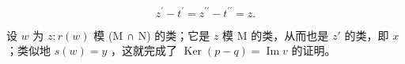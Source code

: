\[
z ^ {\prime} - t ^ {\prime} = z ^ {\prime \prime} - t ^ {\prime \prime} = z.
\]

设 \(w\) 为 \(z; r(w)\) 模 (M ∩ N) 的类；它是 \(z\) 模 M 的类，从而也是 \(z'\) 的类，即 \(x\) ；类似地 \(s(w) = y\) ，这就完成了 \(\operatorname{Ker}(p - q) = \operatorname{Im} v\) 的证明。

